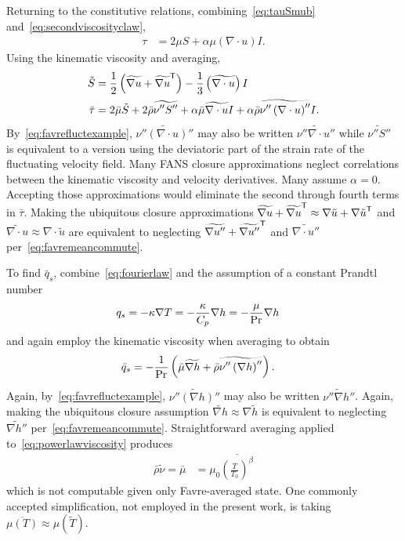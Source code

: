 Returning to the constitutive relations, combining~\eqref{eq:tauSmub}
and~\eqref{eq:secondviscosityclaw},
\begin{align}
  \tau
&= 2 \mu{} S + \alpha \mu \left( \nabla\cdot{}u \right) I.
\end{align}
Using the kinematic viscosity and averaging,
\begin{align}
   \tilde{S}
&=
     \frac{1}{2}\left(
       \widetilde{\nabla{}u} + {\widetilde{\nabla{}u}}^{\mathsf{T}}
     \right)
   - \frac{1}{3}\left(\widetilde{\nabla\cdot{}u}\right) I
\\
  \bar{\tau}
&=
    2 \bar{\mu}\tilde{S}
  + 2 \bar{\rho} \widetilde{\nu''S''}
  + \alpha \bar{\mu} \widetilde{\nabla\cdot{}u} I
  + \alpha \bar{\rho} \widetilde{\nu''\left(\nabla\cdot{}u\right)''} I
.
\end{align}
By~\eqref{eq:favrefluctexample},
$\widetilde{\nu''\left(\nabla\cdot{}u\right)''}$ may also be written
$\widetilde{\nu''\nabla\cdot{}u''}$ while $\widetilde{\nu''S''}$ is equivalent
to a version using the deviatoric part of the strain rate of the fluctuating
velocity field.  Many FANS closure approximations neglect correlations between
the kinematic viscosity and velocity derivatives.  Many assume $\alpha=0$.
Accepting those approximations would eliminate the second through fourth terms
in $\bar{\tau}$.  Making the ubiquitous closure approximations
$\widetilde{\nabla{}u} + {\widetilde{\nabla{}u}}^{\mathsf{T}} \approx \nabla\tilde{u}
+ {\nabla\tilde{u}}^{\mathsf{T}}$ and
$\widetilde{\nabla{}\cdot{}u}\approx\nabla\cdot\tilde{u}$ are equivalent to
neglecting $\widetilde{\nabla{}u''} + {\widetilde{\nabla{}u''}}^{\mathsf{T}}$ and
$\widetilde{\nabla{}\cdot{}u''}$ per~\eqref{eq:favremeancommute}.

To find $\bar{q}_s$, combine~\eqref{eq:fourierlaw} and the assumption of a
constant Prandtl number
\begin{align}
  q_{s} &= - \kappa \nabla{} T
     = - \frac{\kappa}{C_p} \nabla{}h
     = - \frac{\mu}{\mbox{Pr}_{}} \nabla{}h
\end{align}
and again employ the kinematic viscosity when averaging to obtain
\begin{align}
  \bar{q}_s
&= - \frac{1}{\mbox{Pr}_{}}\left(
                \bar{\mu}\widetilde{\nabla{}h}
              + \bar{\rho} \widetilde{\nu''\left(\nabla{}h\right)''}
            \right)
.
\end{align}
Again, by~\eqref{eq:favrefluctexample},
$\widetilde{\nu''\left(\nabla{}h\right)''}$ may also be written
$\widetilde{\nu''\nabla{}h''}$.  Again, making the ubiquitous closure
assumption $\widetilde{\nabla{}h}\approx\nabla\tilde{h}$ is equivalent to
neglecting $\widetilde{\nabla{}h''}$ per~\eqref{eq:favremeancommute}.
Straightforward averaging applied to~\eqref{eq:powerlawviscosity} produces
\begin{align}
   \bar{\rho}\tilde{\nu}
 = \bar{\mu}
&= \mu_0 \overline{\left(\frac{T}{T_0}\right)^\beta}
\end{align}
which is not computable given only Favre-averaged state.  One commonly accepted
simplification, not employed in the present work, is taking
$\overline{\mu\left(T\right)} \approx \mu\left(\tilde{T}\right)$.

